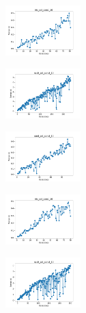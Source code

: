 \vspace*{\fill}

\newpage

\begin{figure}[H]
    \centering
    \begin{subfigure}
        \centering
        \includegraphics[width=0.32\textwidth]{img/bl/iris_set_const_10_949004259_time.png}
    \end{subfigure}
    \hfill
    \begin{subfigure}
        \centering
        \includegraphics[width=0.32\textwidth]{img/bl/ecoli_set_const_10_949004259_time.png}
    \end{subfigure}
    \hfill
    \begin{subfigure}
        \centering
        \includegraphics[width=0.32\textwidth]{img/bl/rand_set_const_10_949004259_time.png}
    \end{subfigure}
    \hfill
    \begin{subfigure}
        \centering
        \includegraphics[width=0.32\textwidth]{img/bl/iris_set_const_10_589741062_time.png}
    \end{subfigure}
    \hfill
    \begin{subfigure}
        \centering
        \includegraphics[width=0.32\textwidth]{img/bl/ecoli_set_const_10_589741062_time.png}

\end{subfigure}
\end{figure}
